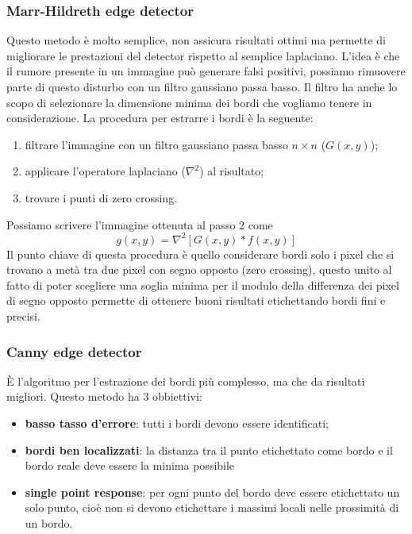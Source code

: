 \subsubsection{Marr-Hildreth edge detector}
Questo metodo è molto semplice, non assicura risultati ottimi ma permette di migliorare le prestazioni del detector rispetto al semplice laplaciano. L'idea è che il rumore presente in un immagine può generare falsi positivi, possiamo rimuovere parte di questo disturbo con un filtro gaussiano passa basso. Il filtro ha anche lo scopo di selezionare la dimensione minima dei bordi che vogliamo tenere in considerazione. La procedura per estrarre i bordi è la seguente:
\begin{enumerate}
	\item filtrare l'immagine con un filtro gaussiano passa basso $n\times n$ ($G(x,y)$);
	\item applicare l'operatore laplaciano ($\nabla^2$) al risultato;
	\item trovare i punti di zero crossing.
\end{enumerate}
Possiamo scrivere l'immagine ottenuta al passo 2 come 
\begin{equation}
	g(x,y) = \nabla^2\left[G(x,y)*f(x,y)\right]
\end{equation}
Il punto chiave di questa procedura è quello considerare bordi solo i pixel che si trovano a metà tra due pixel con segno opposto (zero crossing), questo unito al fatto di poter scegliere una soglia minima per il modulo della differenza dei pixel di segno opposto permette di ottenere buoni risultati etichettando bordi fini e precisi.

\subsubsection{Canny edge detector}
È l'algoritmo per l'estrazione dei bordi più complesso, ma che da risultati migliori. Questo metodo ha 3 obbiettivi:
\begin{itemize}
	\item \textbf{basso tasso d'errore}: tutti i bordi devono essere identificati;
	\item \textbf{bordi ben localizzati}: la distanza tra il punto etichettato come bordo e il bordo reale deve essere la minima possibile
	\item \textbf{single point response}: per ogni punto del bordo deve essere etichettato un solo punto, cioè non si devono etichettare i massimi locali nelle prossimità di un  bordo.
\end{itemize}

